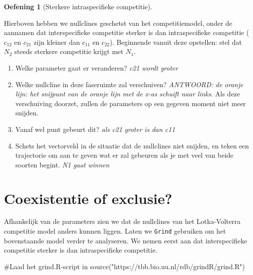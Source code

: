 \documentclass[
  a4paper,
]{scrbook}
\newenvironment{Shaded}{\begin{snugshade}}{\end{snugshade}}
\newcommand{\CommentTok}[1]{\textcolor[rgb]{0.37,0.37,0.37}{#1}}
\newcommand{\FunctionTok}[1]{\textcolor[rgb]{0.28,0.35,0.67}{#1}}
\newcommand{\NormalTok}[1]{\textcolor[rgb]{0.00,0.23,0.31}{#1}}
\newcommand{\StringTok}[1]{\textcolor[rgb]{0.13,0.47,0.30}{#1}}
\providecommand{\tightlist}{%
  \setlength{\itemsep}{0pt}\setlength{\parskip}{0pt}}\usepackage{longtable,booktabs,array}
\theoremstyle{definition}
\newtheorem{exercise}{Oefening}[chapter]
\theoremstyle{remark}
\begin{document}
\begin{exercise}[Sterkere intraspecifieke
competitie]\protect\hypertarget{exr-compofexcl}{}\label{exr-compofexcl}

Hierboven hebben we nullclines geschetst van het competitiemodel, onder
de aannamen dat interspecifieke competitie sterker is dan
intraspecifieke competitie (\(c_{12}\) en \(c_{21}\) zijn kleiner dan
\(c_{11}\) en \(c_{22}\)). Beginnende vanuit deze opstellen: stel dat
\(N_2\) steeds sterkere competitie krijgt met \(N_1\).

\begin{enumerate}
\def\labelenumi{\alph{enumi}.}
\tightlist
\item
  Welke parameter gaat er veranderen? \emph{c21 wordt groter}
\item
  Welke nullcline in deze faseruimte zal verschuiven? \emph{ANTWOORD: de
  oranje lijn: het snijpunt van de oranje lijn met de x-as schuift naar
  links}. Als deze verschuiving doorzet, zullen de parameters op een
  gegeven moment niet meer snijden.
\item
  Vanaf wel punt gebeurt dit? \emph{als c21 groter is dan c11}
\item
  Schets het vectorveld in de situatie dat de nullclines niet snijden,
  en teken een trajectorie om aan te geven wat er zal gebeuren als je
  met veel van beide soorten begint. \emph{N1 gaat winnen}
\end{enumerate}

\end{exercise}

\hypertarget{coexistentie-of-exclusie}{%
\section{Coexistentie of exclusie?}\label{coexistentie-of-exclusie}}

Afhankelijk van de parameters zien we dat de nullclines van het
Lotka-Volterra competitie model anders kunnen liggen. Laten we
\texttt{Grind} gebruiken om het bovenstaande model verder te analyseren.
We nemen eerst aan dat interspecifieke competitie sterker is dan
intraspecifieke competitie.

\begin{Shaded}
\begin{Highlighting}[]
\CommentTok{\#Laad het grind.R{-}script in}
\FunctionTok{source}\NormalTok{(}\StringTok{"https://tbb.bio.uu.nl/rdb/grindR/grind.R"}\NormalTok{)}
\end{Highlighting}
\end{Shaded}
\end{document}
